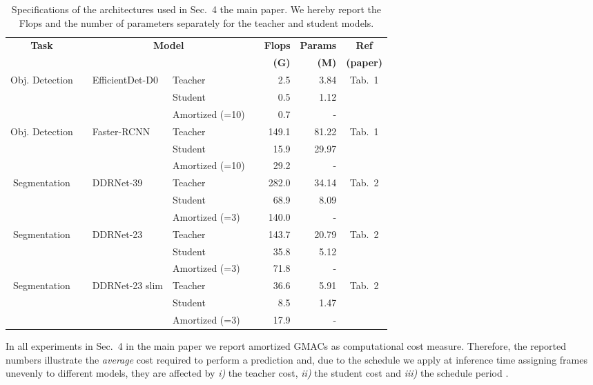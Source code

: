 \documentclass[runningheads]{llncs}
\begin{document}
\begin{table}[tb]
\centering
\caption{Specifications of the architectures used in Sec.~4 the main paper. We hereby report the Flops and the number of parameters separately for the teacher and student models.}
\label{tab:teacher_student_specs}
\begin{tabular}{cm{1em}llm{1em}rrc}
\toprule
\multirow{2}{*}{\textbf{Task}} && \multicolumn{2}{c}{\multirow{2}{*}{\textbf{Model}}} && \textbf{Flops} & \textbf{Params} & \textbf{Ref}\\
&& & && \textbf{(G)} & \textbf{(M)} & \textbf{(paper)}\\
\midrule
\multirow{3}{*}{Obj. Detection} && \multirow{3}{*}{EfficientDet-D0} & Teacher && 2.5 & 3.84 & \multirow{3}{*}{Tab.~1}\\
&& & Student && 0.5 & 1.12\\
&& & Amortized (=10)&& 0.7 & -\\
\midrule
\multirow{3}{*}{Obj. Detection} && \multirow{3}{*}{Faster-RCNN} & Teacher && 149.1 & 81.22 & \multirow{3}{*}{Tab.~1}\\
&& & Student && 15.9 & 29.97\\
&& & Amortized (=10) && 29.2 & -\\
\midrule
\multirow{3}{*}{Segmentation} && \multirow{3}{*}{DDRNet-39} & Teacher && 282.0 & 34.14 & \multirow{3}{*}{Tab.~2}\\
&& & Student && 68.9 & 8.09\\
&& & Amortized (=3) && 140.0 & -\\
\midrule
\multirow{3}{*}{Segmentation} && \multirow{3}{*}{DDRNet-23} & Teacher && 143.7 & 20.79 & \multirow{3}{*}{Tab.~2}\\
&& & Student && 35.8 & 5.12\\
&& & Amortized (=3) && 71.8 & -\\
\midrule
\multirow{3}{*}{Segmentation} && \multirow{3}{*}{DDRNet-23 slim} & Teacher && 36.6 & 5.91 & \multirow{3}{*}{Tab.~2}\\
&& & Student && 8.5 & 1.47\\
&& & Amortized (=3) && 17.9 & -\\
\bottomrule
\end{tabular}\end{table} In all experiments in Sec.~4 in the main paper we report amortized GMACs as computational cost measure.
Therefore, the reported numbers illustrate the \emph{average} cost required to perform a prediction and, due to the schedule we apply at inference time assigning frames unevenly to different models, they are affected by \emph{i)} the teacher cost, \emph{ii)} the student cost and \emph{iii)} the schedule period .
\end{document}
